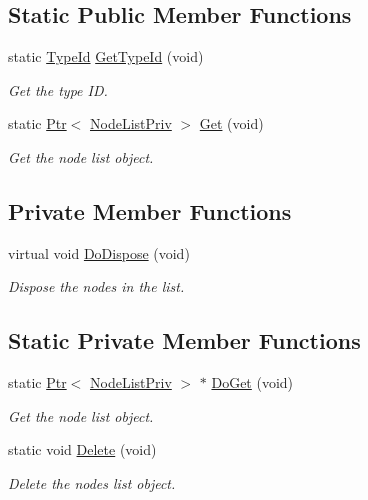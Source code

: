 \subsection*{Static Public Member Functions}
\begin{DoxyCompactItemize}
\item 
static \hyperlink{classns3_1_1TypeId}{Type\+Id} \hyperlink{classns3_1_1NodeListPriv_a82eccf7314f15f80e48f47e09b74ab01}{Get\+Type\+Id} (void)
\begin{DoxyCompactList}\small\item\em Get the type ID. \end{DoxyCompactList}\item 
static \hyperlink{classns3_1_1Ptr}{Ptr}$<$ \hyperlink{classns3_1_1NodeListPriv}{Node\+List\+Priv} $>$ \hyperlink{classns3_1_1NodeListPriv_a746ce1482b3c1cf31d5a50cd55cffa92}{Get} (void)
\begin{DoxyCompactList}\small\item\em Get the node list object. \end{DoxyCompactList}\end{DoxyCompactItemize}
\subsection*{Private Member Functions}
\begin{DoxyCompactItemize}
\item 
virtual void \hyperlink{classns3_1_1NodeListPriv_a364a07542b9c164307aad0a8918e7748}{Do\+Dispose} (void)
\begin{DoxyCompactList}\small\item\em Dispose the nodes in the list. \end{DoxyCompactList}\end{DoxyCompactItemize}
\subsection*{Static Private Member Functions}
\begin{DoxyCompactItemize}
\item 
static \hyperlink{classns3_1_1Ptr}{Ptr}$<$ \hyperlink{classns3_1_1NodeListPriv}{Node\+List\+Priv} $>$ $\ast$ \hyperlink{classns3_1_1NodeListPriv_a6f0222de939567a488905f1c6876c4ca}{Do\+Get} (void)
\begin{DoxyCompactList}\small\item\em Get the node list object. \end{DoxyCompactList}\item 
static void \hyperlink{classns3_1_1NodeListPriv_a74f1811844a3891e71d8d9adbe81c33e}{Delete} (void)
\begin{DoxyCompactList}\small\item\em Delete the nodes list object. \end{DoxyCompactList}\end{DoxyCompactItemize}
